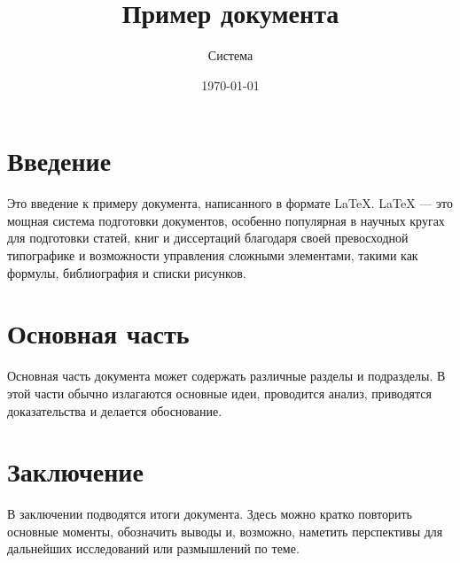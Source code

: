 \documentclass{article}
\title{Пример документа}
\author{Система}
\date{\today}
\begin{document}
\maketitle

\section{Введение}
Это введение к примеру документа, написанного в формате LaTeX. LaTeX — это мощная система подготовки документов, особенно популярная в научных кругах для подготовки статей, книг и диссертаций благодаря своей превосходной типографике и возможности управления сложными элементами, такими как формулы, библиография и списки рисунков.

\section{Основная часть}
Основная часть документа может содержать различные разделы и подразделы. В этой части обычно излагаются основные идеи, проводится анализ, приводятся доказательства и делается обоснование.

\section{Заключение}
В заключении подводятся итоги документа. Здесь можно кратко повторить основные моменты, обозначить выводы и, возможно, наметить перспективы для дальнейших исследований или размышлений по теме.
\end{document}
